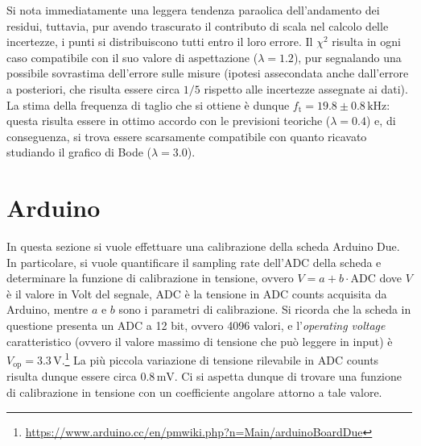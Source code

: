 \documentclass[a4paper,11pt]{article} %
\begin{document}
\noindent Si nota immediatamente una leggera tendenza paraolica dell'andamento dei residui, tuttavia, pur avendo
trascurato il contributo di scala nel calcolo delle incertezze, i punti si distribuiscono tutti entro il loro errore. Il
$\chi^2$ risulta in ogni caso compatibile con il suo valore di aspettazione ($\lambda = 1.2$), pur segnalando una
possibile sovrastima dell'errore sulle misure (ipotesi assecondata anche dall'errore a posteriori, che risulta essere
circa $1/5$ rispetto alle incertezze assegnate ai dati). La stima della frequenza di taglio che si ottiene è dunque
$f_{\text{t}} = 19.8\pm 0.8\,\si{\kHz}$: questa risulta essere in ottimo accordo con le previsioni teoriche
($\lambda=0.4$) e, di conseguenza, si trova essere scarsamente compatibile con quanto ricavato studiando il grafico di
Bode ($\lambda = 3.0$).





























\section{Arduino}
In questa sezione si vuole effettuare una calibrazione della scheda Arduino Due. In particolare, si vuole quantificare
il sampling rate dell'ADC della scheda e determinare la funzione di calibrazione in tensione, ovvero $V = a + b \cdot
\text{ADC}$ dove $V$ è il valore in Volt del segnale, $\text{ADC}$ è la tensione in ADC counts acquisita da Arduino,
mentre $a$ e $b$ sono i parametri di calibrazione. Si ricorda che la scheda in questione presenta un ADC a 12 bit,
ovvero 4096 valori, e l'\textit{operating voltage} caratteristico (ovvero il valore massimo di tensione che può leggere
in input) è $V_{\text{op}}=3.3\,\si{\volt}$.\footnote{\url{https://www.arduino.cc/en/pmwiki.php?n=Main/arduinoBoardDue}}
La più piccola variazione di tensione rilevabile in ADC counts risulta dunque essere circa $0.8\,\si{\mV}$. Ci si
aspetta dunque di trovare una funzione di calibrazione in tensione con un coefficiente angolare attorno a tale valore. 
\end{document}
